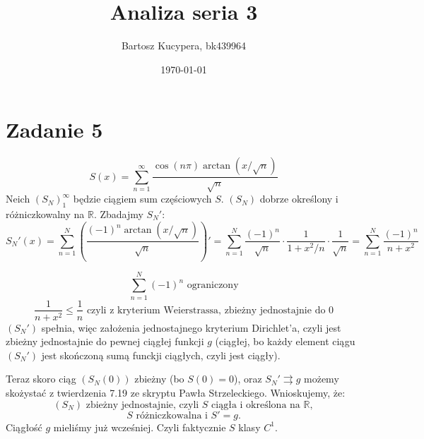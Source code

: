 \documentclass{article}
\title{Analiza seria 3}
\author{Bartosz Kucypera, bk439964}
\date{\today}
\begin{document}
\maketitle

\section*{Zadanie 5}
$$S(x) = \displaystyle \sum_{n=1}^{\infty}\frac{\cos(n\pi)\arctan(x/ \sqrt{n})}{\sqrt{n}} $$
Neich $(S_N)_{1}^{\infty}$ będzie ciągiem sum częściowych $S$. 
$(S_N)$ dobrze określony i różniczkowalny na $\mathbb{R}$. \newline
Zbadajmy $S_N'$:
$$ S_N'(x) = \sum_{n=1}^{N} \left( \frac{(-1)^n \arctan(x/ \sqrt{n})}{\sqrt{n}} \right)' =
\sum_{n=1}^{N} \frac{(-1)^n}{\sqrt{n}} \cdot \frac{1}{1 + x^2 /n} \cdot \frac{1}{\sqrt{n}} =
\sum_{n=1}^{N} \frac{(-1)^n}{n+x^2}$$

$$ \sum_{n=1}^{N}(-1)^n \mbox{ ograniczony} $$
$$\frac{1}{n+x^2} \le \frac{1}{n} \mbox{ czyli z kryterium Weierstrassa, zbieżny jednostajnie do 0}$$
$(S_N')$ spełnia, więc założenia jednostajnego kryterium Dirichlet'a, czyli jest zbieżny jednostajnie do pewnej ciągłej funkcji $g$ (ciągłej, bo każdy element ciągu $(S_N')$ jest skończoną sumą funckji ciągłych, czyli jest ciągły). \newline \newline

Teraz skoro ciąg $(S_N(0))$ zbieżny (bo $S(0) = 0$), oraz $S_N' \rightrightarrows g$ możemy skożystać z twierdzenia 7.19 ze skryptu Pawła Strzeleckiego. \newline 
Wnioskujemy, że: 
$$(S_N) \mbox{ zbieżny jednostajnie, czyli } S \mbox{ ciągła i określona na } \mathbb{R},$$
$$ S \mbox{ różniczkowalna i } S' = g. $$
Ciągłość $g$ mieliśmy już wcześniej.
Czyli faktycznie $S$ klasy $C^1$.
\end{document}
